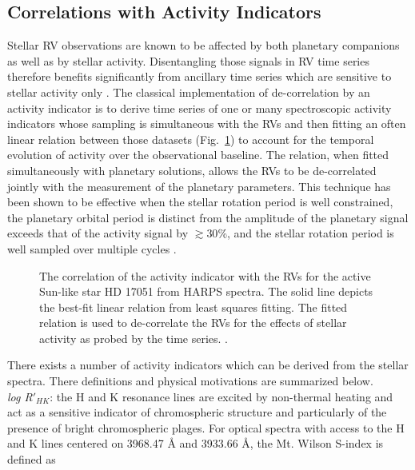 \subsection{Correlations with Activity Indicators}
Stellar RV observations are known to be affected by both planetary companions as
well as by stellar activity. Disentangling those signals in RV time series
therefore benefits significantly from ancillary time series which are sensitive
to stellar activity only \citep{boisse09}.
The classical implementation of de-correlation by
an activity indicator is to derive time series of one or many spectroscopic
activity indicators whose sampling is simultaneous with the RVs and then
fitting an often linear relation between those datasets (Fig.~\ref{fig:corr}) to
account for the temporal evolution of activity over the observational baseline.
The relation, when fitted simultaneously with planetary solutions, allows the RVs
to be de-correlated jointly with the measurement of the planetary parameters.
This technique has been shown to be effective when the stellar rotation period
\prot{} is well constrained, the planetary orbital period is distinct from
\prot{,} the amplitude of the planetary signal exceeds that of the activity signal
by $\gtrsim 30$\%, and the stellar rotation period is well sampled over multiple
cycles \citep{boisse11}. \\

\begin{figure}
  \centering
  \caption[Correlation between stellar RVs and the \vspan{} activity indicator.]
      {The correlation of the \vspan{} activity indicator with the RVs for the
    active Sun-like star HD 17051 from HARPS spectra. The solid line depicts the
    best-fit linear relation from least squares fitting. The fitted relation is
    used to de-correlate the RVs for the effects of stellar activity as probed by
    the \vspan{} time series. \citep[Image credit:][]{boisse11}.}
  \label{fig:corr}
\end{figure}

There exists a number of activity indicators which can be derived from the stellar
spectra. There definitions and physical motivations are summarized below. \\

\emph{log R$'_{HK}$}:
the \caii{} H and K resonance lines are excited by non-thermal heating 
and act as a sensitive indicator of chromospheric structure and particularly of
the presence of bright chromospheric plages. 
For optical spectra with access to the \caii{} H and K lines
centered on 3968.47 \AA{} and 3933.66 \AA{,} the Mt. Wilson S-index is defined as

